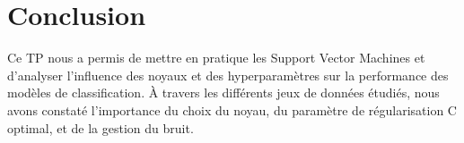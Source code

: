 \documentclass[a4paper,12pt]{article}
\begin{document}
\section{Conclusion}

Ce TP nous a permis de mettre en pratique les Support Vector Machines et d'analyser l'influence des noyaux et des hyperparamètres sur la performance des modèles de classification. À travers les différents jeux de données étudiés, nous avons constaté l'importance du choix du noyau, du paramètre de régularisation C optimal, et de la gestion du bruit.
\end{document}
